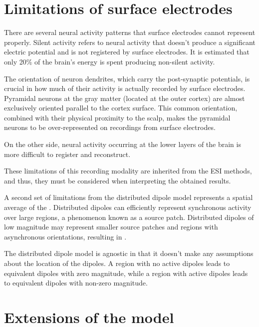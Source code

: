 \section{Limitations of surface electrodes}



There are several neural activity patterns that surface electrodes cannot represent properly.
%
Silent activity refers to neural activity that doesn't produce a significant electric potential and is not registered by surface electrodes.
%
It is estimated that only 20\% of the brain's energy is spent producing non-silent activity.

The orientation of neuron dendrites, which carry the post-synaptic potentials, is crucial in how much of their activity is actually recorded by surface electrodes.
%
Pyramidal neurons at the gray matter (located at the outer cortex) are almost exclusively oriented parallel to the cortex surface.
%
This common orientation, combined with their physical proximity to the scalp, makes the pyramidal neurons to be over-represented on recordings from surface electrodes.

On the other side, neural activity occurring at the lower layers of the brain is more difficult to register and reconstruct.

These limitations of this recording modality are inherited from the ESI methods, and thus, they must be considered when interpreting the obtained results.

A second set of limitations from the distributed dipole model represents a spatial average of the .
%
Distributed dipoles can efficiently represent synchronous activity over large regions, a phenomenon known as a source patch.
%
Distributed dipoles of low magnitude may represent smaller source patches and regions with asynchronous orientations, resulting in .




%
The distributed dipole model is agnostic in that it doesn't make any assumptions about the location of the dipoles.
%
A region with no active dipoles leads to equivalent dipoles with zero magnitude, while a region with active dipoles leads to equivalent dipoles with non-zero magnitude.

\section{Extensions of the model}

